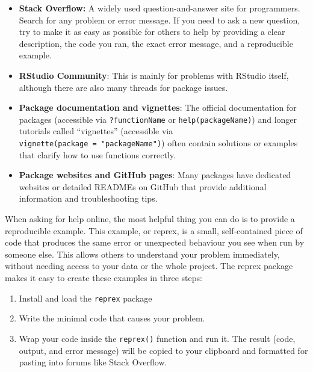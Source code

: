 \documentclass[
]{book}
\providecommand{\tightlist}{%
  \setlength{\itemsep}{0pt}\setlength{\parskip}{0pt}}
\begin{document}
\begin{itemize}
\item
  \textbf{Stack Overflow:} A widely used question-and-answer site for programmers. Search for any problem or error message. If you need to ask a new question, try to make it as easy as possible for others to help by providing a clear description, the code you ran, the exact error message, and a reproducible example.
\item
  \textbf{RStudio Community}: This is mainly for problems with RStudio itself, although there are also many threads for package issues.
\item
  \textbf{Package documentation and vignettes}: The official documentation for packages (accessible via \texttt{?functionName} or \texttt{help(packageName)}) and longer tutorials called ``vignettes'' (accessible via \texttt{vignette(package\ =\ "packageName")}) often contain solutions or examples that clarify how to use functions correctly.
\item
  \textbf{Package websites and GitHub pages}: Many packages have dedicated websites or detailed READMEs on GitHub that provide additional information and troubleshooting tips.
\end{itemize}

When asking for help online, the most helpful thing you can do is to provide a reproducible example. This example, or reprex, is a small, self-contained piece of code that produces the same error or unexpected behaviour you see when run by someone else. This allows others to understand your problem immediately, without needing access to your data or the whole project. The reprex package makes it easy to create these examples in three steps:

\begin{enumerate}
\def\labelenumi{\arabic{enumi}.}
\tightlist
\item
  Install and load the \texttt{reprex} package
\item
  Write the minimal code that causes your problem.
\item
  Wrap your code inside the \texttt{reprex()} function and run it. The result (code, output, and error message) will be copied to your clipboard and formatted for pasting into forums like Stack Overflow.
\end{enumerate}
\end{document}

